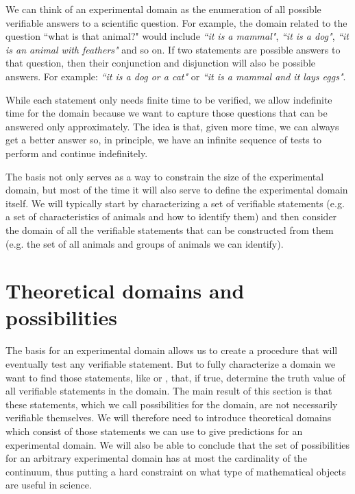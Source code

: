 \documentclass[11pt,letterpaper,fleqn]{memoir} %
\begin{document}
We can think of an experimental domain as the enumeration of all possible verifiable answers to a scientific question. For example, the domain related to the question ``what is that animal?" would include \emph{``it is a mammal"}, \emph{``it is a dog"}, \emph{``it is an animal with feathers"} and so on. If two statements are possible answers to that question, then their conjunction and disjunction will also be possible answers. For example: \emph{``it is a dog or a cat"} or \emph{``it is a mammal and it lays eggs"}.

While each statement only needs finite time to be verified, we allow indefinite time for the domain because we want to capture those questions that can be answered only approximately. The idea is that, given more time, we can always get a better answer so, in principle, we have an infinite sequence of tests to perform and continue indefinitely.

The basis not only serves as a way to constrain the size of the experimental domain, but most of the time it will also serve to define the experimental domain itself. We will typically start by characterizing a set of verifiable statements (e.g. a set of characteristics of animals and how to identify them) and then consider the domain of all the verifiable statements that can be constructed from them (e.g. the set of all animals and groups of animals we can identify).

\section{Theoretical domains and possibilities}

The basis for an experimental domain allows us to create a procedure that will eventually test any verifiable statement. But to fully characterize a domain we want to find those statements, like  or , that, if true, determine the truth value of all verifiable statements in the domain. The main result of this section is that these statements, which we call possibilities for the domain, are not necessarily verifiable themselves. We will therefore need to introduce theoretical domains which consist of those statements we can use to give predictions for an experimental domain. We will also be able to conclude that the set of possibilities for an arbitrary experimental domain has at most the cardinality of the continuum, thus putting a hard constraint on what type of mathematical objects are useful in science.
\end{document}
